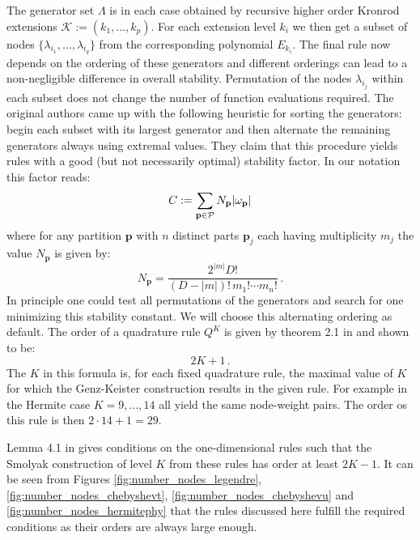 \documentclass[a4paper,10pt]{article}
\begin{document}
The generator set $\Lambda$ is in each case obtained by recursive higher order
Kronrod extensions $\mathcal{K} := (k_1, \ldots, k_p)$. For each extension level $k_i$
we then get a subset of nodes $\{\lambda_{i_1}, \ldots, \lambda_{i_q}\}$ from the corresponding
polynomial $E_{k_i}$. The final rule now depends on the ordering of these generators
and different orderings can lead to a non-negligible difference in overall stability. Permutation of
the nodes $\lambda_{i_j}$ within each subset does not change the number of function evaluations
required. The original authors came up with the following heuristic for sorting the
generators: begin each subset with its largest generator and then alternate the remaining
generators always using extremal values. They claim that this procedure yields
rules with a good (but not necessarily optimal) stability factor. In our notation
this factor reads:
\begin{equation*}
  C := \sum_{\mathbf{p} \in \mathcal{P}} N_{\mathbf{p}} |\omega_{\mathbf{p}}|
\end{equation*}
where for any partition $\mathbf{p}$ with $n$ distinct parts $\mathbf{p}_j$ each
having multiplicity $m_j$ the value $N_{\mathbf{p}}$ is given by:
\begin{equation*}
  N_{\mathbf{p}} = \frac{2^{|m|} D!}
                        {(D-|m|)! \, m_1! \cdots m_n!} \,.
\end{equation*}
In principle one could test all permutations of the generators and search for
one minimizing this stability constant. We will choose this alternating ordering
as default.
The order of a quadrature rule $Q^K$ is given by theorem 2.1 in \cite{genz}
and shown to be:
\begin{equation} \label{eq:gk_rul_order}
  2 K + 1 \,.
\end{equation}
The $K$ in this formula is, for each fixed quadrature
rule, the maximal value of $K$ for which the Genz-Keister construction results
in the given rule. For example in the Hermite case $K=9, \ldots, 14$ all yield
the same node-weight pairs. The order os this rule is then $2\cdot 14 + 1 = 29$.

Lemma 4.1 in \cite{holtz} gives conditions on the one-dimensional rules
such that the Smolyak construction of level $K$ from these rules has
order at least $2K-1$. It can be seen from Figures \ref{fig:number_nodes_legendre},
\ref{fig:number_nodes_chebyshevt}, \ref{fig:number_nodes_chebyshevu} and
\ref{fig:number_nodes_hermitephy} that the rules discussed here fulfill the
required conditions as their orders are always large enough.
\end{document}
